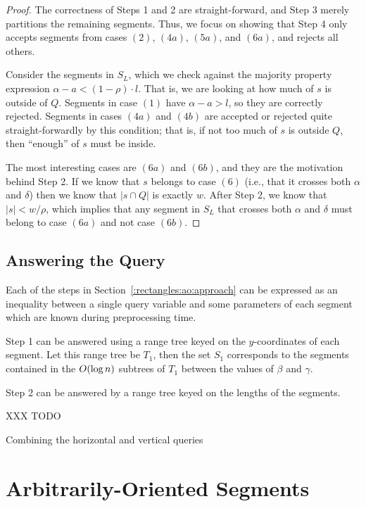 \begin{proof}
The correctness of Steps 1 and 2 are straight-forward, and Step 3 merely partitions the remaining segments. Thus, we focus on showing that Step 4 only accepts segments from cases $(2)$, $(4a)$, $(5a)$, and $(6a)$, and rejects all others.

Consider the segments in $S_L$, which we check against the majority property expression $\alpha - a < (1 - \rho) \cdot l$. That is, we are looking at how much of $s$ is outside of $Q$. Segments in case $(1)$ have $\alpha - a > l$, so they are correctly rejected. Segments in cases $(4a)$ and $(4b)$ are accepted or rejected quite straight-forwardly by this condition; that is, if not too much of $s$ is outside $Q$, then ``enough'' of $s$ must be inside.  

The most interesting cases are $(6a)$ and $(6b)$, and they are the motivation behind Step 2.  If we know that $s$ belongs to case $(6)$ (i.e., that it crosses both $\alpha$ and $\delta$) then we know that $|s \cap Q|$ is exactly $w$. After Step 2, we know that $|s| < w / \rho$, which implies that any segment in $S_L$ that crosses both $\alpha$ and $\delta$ must belong to case $(6a)$ and not case $(6b)$.

\end{proof}


\subsection{Answering the Query}
\label{:rectangles:ap:analysis}

Each of the steps in Section~\ref{:rectangles:ao:approach} can be expressed as an inequality between a single query variable and some parameters of each segment which are known during preprocessing time.

Step 1 can be answered using a range tree keyed on the $y$-coordinates of each segment. Let this range tree be $T_1$, then the set $S_1$ corresponds to the segments contained in the $O\!\left(\log{n}\right)$ subtrees of $T_1$ between the values of $\beta$ and $\gamma$.

Step 2 can be answered by a range tree keyed on the lengths of the segments.

 


XXX TODO

Combining the horizontal and vertical queries


\section{Arbitrarily-Oriented Segments}
\label{:rectangles:ao}

